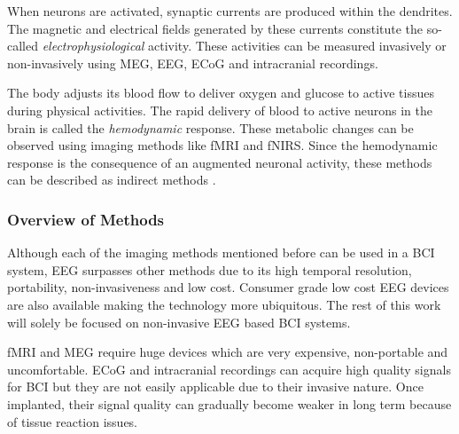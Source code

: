\documentclass[12pt]{article}
\newcommand\mysubsubsection[1]{\subsubsection{#1}}
\numberwithin{equation}{section}
\numberwithin{figure}{section}
\numberwithin{table}{section}
\begin{document}
\par{
    When neurons are activated, synaptic currents are produced within the dendrites.
    The magnetic and electrical fields generated by these currents constitute the
    so-called \emph{electrophysiological} activity. These activities can be measured
    invasively or non-invasively using MEG, EEG, ECoG and intracranial recordings.
}
\par{
    The body adjusts its blood flow to deliver oxygen and glucose to active tissues
    during physical activities. The rapid delivery of blood to active neurons in
    the brain is called the \emph{hemodynamic} response. These metabolic changes
    can be observed using imaging methods like fMRI and fNIRS. Since
    the hemodynamic response is the consequence of an augmented neuronal activity,
    these methods can be described as indirect methods \citep{nicolas-alonso_brain_2012}.
}
\mysubsubsection{Overview of Methods}
\par{
    Although each of the imaging methods mentioned before can be used in a BCI system,
    EEG surpasses other methods due to its high temporal resolution, portability,
    non-invasiveness and low cost. Consumer grade low cost EEG devices are also
    available making the technology more ubiquitous. The rest of this work will solely be focused on non-invasive EEG based BCI systems.
}
\par{
    fMRI and MEG require huge devices which are very expensive, non-portable and uncomfortable.
    ECoG and intracranial recordings can acquire high quality signals for BCI but they are not easily
    applicable due to their invasive nature. Once implanted, their signal quality
    can gradually become weaker in long term because of tissue reaction issues.
}
\end{document}

